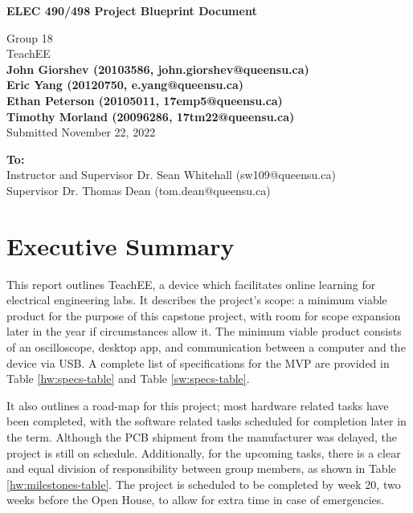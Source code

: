 \documentclass[letterpaper,12pt]{article}
\begin{document}
\begin{titlepage}
    \begin{center}
        \vspace*{1cm}

        \Large
        \textbf{ELEC 490/498 Project Blueprint Document}

        \vspace{0.5cm}
        Group 18\\
        TeachEE\\
        \vspace{0.5cm}
        \normalsize
        \textbf{John Giorshev (20103586, john.giorshev@queensu.ca) \\ Eric Yang (20120750, e.yang@queensu.ca) \\ Ethan Peterson (20105011, 17emp5@queensu.ca) \\ Timothy Morland (20096286, 17tm22@queensu.ca)}\\
        \vspace{0.5cm}
        Submitted November 22, 2022\\

        \vfill
            
        \textbf{To:}\\
        Instructor and Supervisor Dr. Sean Whitehall (sw109@queensu.ca) \\
        Supervisor Dr. Thomas Dean (tom.dean@queensu.ca) \\
            
        \vspace{1.8cm}

    \end{center}
\end{titlepage}
\section{Executive Summary}

This report outlines TeachEE, a device which facilitates online learning for
electrical engineering labs. It describes the project's scope: a minimum viable
product for the purpose of this capstone project, with room for scope expansion
later in the year if circumstances allow it. The minimum viable product consists
of an oscilloscope, desktop app, and communication between a computer and the
device via USB. A complete list of specifications for the MVP are provided in
Table \ref{hw:specs-table} and Table \ref{sw:specs-table}.

It also outlines a road-map for this project; most hardware related tasks have
been completed, with the software related tasks scheduled for completion later
in the term. Although the PCB shipment from the manufacturer was delayed, the
project is still on schedule. Additionally, for the upcoming tasks, there is a
clear and equal division of responsibility between group members, as shown in
Table \ref{hw:milestones-table}. The project is scheduled to be completed by
week 20, two weeks before the Open House, to allow for extra time in case of
emergencies.
\end{document}
